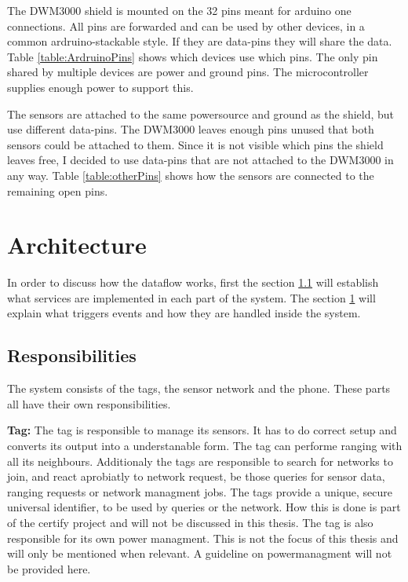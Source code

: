 The DWM3000 shield is mounted on the 32 pins meant for arduino one connections. 
All pins are forwarded and can be used by other devices, in a common ardruino-stackable style.
If they are data-pins they will share the data.
Table \ref{table:ArdruinoPins} shows which devices use which pins.
The only pin shared by multiple devices are power and ground pins.
The microcontroller supplies enough power to support this.

The sensors are attached to the same powersource and ground as the shield, but use different data-pins.
The DWM3000 leaves enough pins unused that both sensors could be attached to them.
Since it is not visible which pins the shield leaves free, I decided to use data-pins that are not attached to the DWM3000 in any way.
Table \ref{table:otherPins} shows how the sensors are connected to the remaining open pins.

\section{Architecture}
\label{ss:dataflow}

In order to discuss how the dataflow works, first the section \ref{ss:responsibility} will establish what services are implemented in each part of the system.
The section \ref{ss:dataflow} will explain what triggers events and how they are handled inside the system.

\subsection{Responsibilities}
\label{ss:responsibility}
The system consists of the tags, the sensor network and the phone.
These parts all have their own responsibilities.

\textbf{Tag:} 
The tag is responsible to manage its sensors. 
It has to do correct setup and converts its output into a understanable form.
The tag can performe ranging with all its neighbours.
Additionaly the tags are responsible to search for networks to join, and react aprobiatly to network request, be those queries for sensor data, ranging requests or network managment jobs. 
The tags provide a unique, secure universal identifier, to be used by queries or the network.
How this is done is part of the certify project and will not be discussed in this thesis.
The tag is also responsible for its own power managment.
This is not the focus of this thesis and will only be mentioned when relevant.
A guideline on powermanagment will not be provided here.

